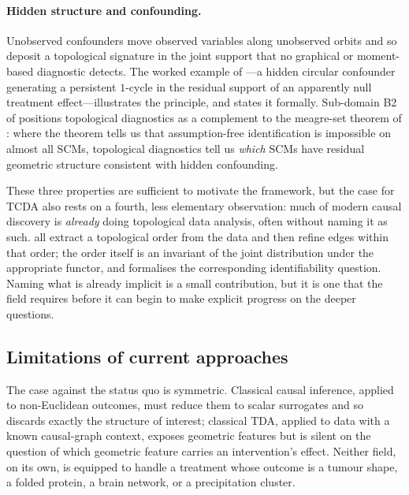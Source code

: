 \paragraph{Hidden structure and confounding.}
Unobserved confounders move observed variables along unobserved
orbits and so deposit a topological signature in the joint support
that no graphical or moment-based diagnostic detects. The
worked example of ---a hidden circular
confounder generating a persistent $1$-cycle in the residual support
of an apparently null treatment effect---illustrates the principle,
and  states it formally. Sub-domain
B2 of  positions topological diagnostics as a
complement to the meagre-set theorem of
\citet{ibeling2021topological}: where the theorem tells us that
assumption-free identification is impossible on almost all SCMs,
topological diagnostics tell us \emph{which} SCMs have residual
geometric structure consistent with hidden confounding.

These three properties are sufficient to motivate the framework, but
the case for TCDA also rests on a fourth, less elementary observation:
much of modern causal discovery is \emph{already} doing topological
data analysis, often without naming it as such.
\citet{rolland2022score,tran2024constraining,xu2025information,
nocurl2024,wu2026optimization} all extract a topological order from
the data and then refine edges within that order; the order itself is
an invariant of the joint distribution under the appropriate functor,
and  formalises the corresponding
identifiability question. Naming what is already implicit is a small
contribution, but it is one that the field requires before it can
begin to make explicit progress on the deeper questions.

\subsection{Limitations of current approaches}\label{sec:intro_limits}

The case against the status quo is symmetric. Classical causal
inference, applied to non-Euclidean outcomes, must reduce them to
scalar surrogates and so discards exactly the structure of interest;
classical TDA, applied to data with a known causal-graph context,
exposes geometric features but is silent on the question of which
geometric feature carries an intervention's effect. Neither field, on
its own, is equipped to handle a treatment whose outcome is a tumour
shape, a folded protein, a brain network, or a precipitation cluster.

